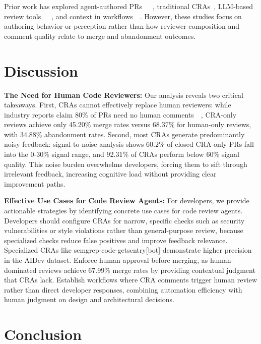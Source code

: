 \documentclass[sigconf]{acmart}
\begin{document}
Prior work has explored agent-authored PRs~\cite{Watanabe_2025_AgenticPR}~\cite{Horikawa_2025_AgenticRefactoring}~\cite{Twist_2025_LibraryUsage}, traditional CRAs~\cite{Wessel_2020_BotsSurvey}, LLM-based review tools~\cite{Ramesh_2025_Ericsson}~\cite{Vijayvergiya_2024_AutoCommenter}~\cite{Lin_2025_CodeReviewQA}, and context in workflows~\cite{Chatlatanagulchai_2025_AgentREADMEs}~\cite{Fakhoury_2024_TiCoder}. However, these studies focus on authoring behavior or perception rather than how reviewer composition and comment quality relate to merge and abandonment outcomes.



\section{Discussion}

 \textbf{The Need for Human Code Reviewers:} Our analysis reveals two critical takeaways. First, CRAs cannot effectively replace human reviewers: while industry reports claim 80\% of PRs need no human comments~\cite{QodoReport_2025}~\cite{GreptileReport_2025}, CRA-only reviews achieve only 45.20\% merge rates versus 68.37\% for human-only reviews, with 34.88\% abandonment rates. Second, most CRAs generate predominantly noisy feedback: signal-to-noise analysis shows 60.2\% of closed CRA-only PRs fall into the 0-30\% signal range, and 92.31\% of CRAs perform below 60\% signal quality. This noise burden overwhelms developers, forcing them to sift through irrelevant feedback, increasing cognitive load without providing clear improvement paths.


\textbf{Effective Use Cases for Code Review Agents:} For developers, we provide actionable strategies by identifying concrete use cases for code review agents. Developers should configure CRAs for narrow, specific checks such as security vulnerabilities or style violations rather than general-purpose review, because specialized checks reduce false positives and improve feedback relevance. Specialized CRAs like semgrep-code-getsentry[bot] demonstrate higher precision in the AIDev dataset. Enforce human approval before merging, as human-dominated reviews achieve 67.99\% merge rates by providing contextual judgment that CRAs lack. Establish workflows where CRA comments trigger human review rather than direct developer responses, combining automation efficiency with human judgment on design and architectural decisions.


\section{Conclusion}
\end{document}
